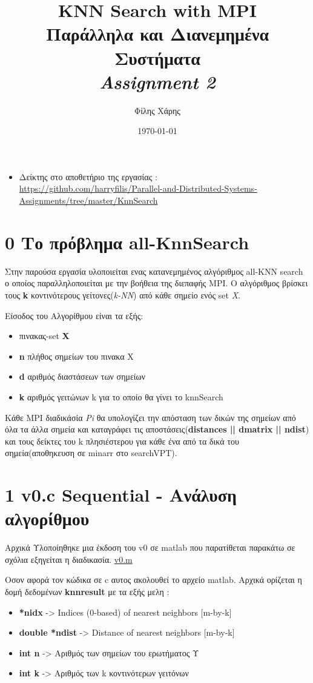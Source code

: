 \documentclass[10pt]{report}
\title{
KNN Search with MPI\\ 
\large Παράλληλα και Διανεμημένα Συστήματα\\ 
\textit{Assignment 2}}
\author{Φίλης Χάρης}
\date{\today}
\begin{document}
\maketitle
\newpage
\begin{itemize}
\item Δείκτης στο αποθετήριο της εργασίας :\\
\href{https://github.com/harryfilis/Parallel_and_Distributed_Systems_Assignments/tree/master/KnnSearch}{https://github.com/harryfilis/Parallel-and-Distributed-Systems-Assignments/tree/master/KnnSearch}
\end{itemize}
\section{0 Το πρόβλημα  all-KnnSearch}
Στην παρούσα εργασία υλοποιείται ενας κατανεμημένος αλγόριθμος all-KNN search ο οποίος παραλληλοποιείται με την βοήθεια της διεπαφής MPI. Ο αλγόριθμος βρίσκει τους \textbf{k} κοντινότερους γείτονες(\emph{k-NN}) από κάθε σημείο ενός set \emph{X}.

Είσοδος του Αλγορίθμου είναι τα εξής:
\begin{itemize}
\item πινακας-set \textbf{X}
\item \textbf{n} πλήθος σημείων του πινακα Χ
\item \textbf{d} αριθμός διαστάσεων των σημείων
\item \textbf{k} αριθμός γειτώνων k για το οποίο θα γίνει το knnSearch
\end{itemize}
Κάθε MPI διαδικάσία \emph{Pi} θα υπολογίζει την απόσταση των δικών της σημείων από όλα τα άλλα σημεία και καταγράφει τις αποστάσεις(\textbf{distances || dmatrix || ndist}) και τους δείκτες του k πλησιέστερου για κάθε ένα από τα δικά του σημεία(αποθηκευση σε minarr στο searchVPT).


\section{1 v0.c Sequential - Ανάλυση αλγορίθμου}
Αρχικά Υλοποίηθηκε μια έκδοση του v0 σε matlab που παρατίθεται παρακάτω σε σχόλια εξηγείται η διαδικασία.
\href{https://github.com/harryfilis/Parallel-and-Distributed-Systems-Assignments/tree/master/KnnSearch/matlab/v0.m}{v0.m}

Οσον αφορά τον κώδικα σε c αυτος ακολουθεί το αρχείο matlab.
Αρχικά ορίζεται η δομή δεδομένων \textbf{knnresult} με τα εξής μελη :
\begin{itemize}
\item \textbf{*nidx} -> Indices (0-based) of nearest neighbors [m-by-k]
\item \textbf{double *ndist} -> Distance of nearest neighbors          [m-by-k]
\item \textbf{int n} -> Αριθμός των σημείων του ερωτήματος Υ
\item \textbf{int k} -> Αριθμός των k κοντινότερων γειτόνων
\end{itemize}
\end{document}
